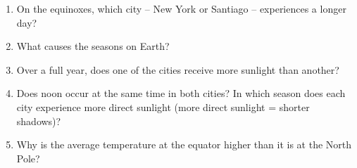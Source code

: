 \documentclass[11pt]{article}%
\begin{document}
\begin{enumerate}
\item On the equinoxes, which city -- New York or Santiago -- experiences a longer day?

\item What causes the seasons on Earth?

\item Over a full year, does one of the cities receive more sunlight than another?

\item Does noon occur at the same time in both cities?  In which season does each city experience more direct sunlight (more direct sunlight = shorter shadows)?

\item Why is the average temperature at the equator higher than it is at the North Pole?

\end{enumerate}

\newpage
\pagebreak








\end{document}
